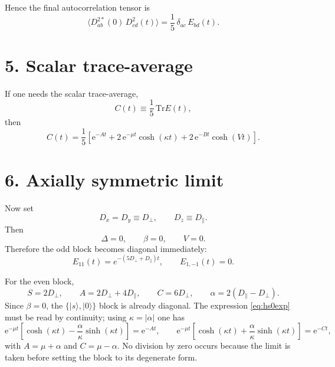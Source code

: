 \documentclass[11pt]{article}
\newcommand{\e}{\mathrm{e}}
\newcommand{\tr}{\mathrm{Tr}}
\begin{document}
Hence the final autocorrelation tensor is
\begin{equation}
\boxed{
\big\langle D^{2*}_{ab}(0)\,D^2_{cd}(t)\big\rangle
=
\frac{1}{5}\,\delta_{ac}\,E_{bd}(t).
}
\end{equation}

\section*{5. Scalar trace-average}

If one needs the scalar trace-average,
\begin{equation}
C(t)\equiv \frac{1}{5}\,\tr E(t),
\end{equation}
then
\begin{equation}
\boxed{
C(t)=\frac15\left[
\e^{-At}
+2\,\e^{-\mu t}\cosh(\kappa t)
+2\,\e^{-Bt}\cosh(Vt)
\right].
}
\end{equation}

\section*{6. Axially symmetric limit}

Now set
\begin{equation}
D_x=D_y\equiv D_\perp,
\qquad
D_z\equiv D_\parallel.
\end{equation}
Then
\begin{equation}
\Delta=0,\qquad \beta=0,\qquad V=0.
\end{equation}
Therefore the odd block becomes diagonal immediately:
\begin{equation}
E_{11}(t)=e^{-(5D_\perp+D_\parallel)t},
\qquad
E_{1,-1}(t)=0.
\end{equation}

For the even block,
\begin{equation}
S=2D_\perp,
\qquad
A=2D_\perp+4D_\parallel,
\qquad
C=6D_\perp,
\qquad
\alpha=2(D_\parallel-D_\perp).
\end{equation}
Since $\beta=0$, the $\{|s\rangle,|0\rangle\}$ block is already diagonal.  The expression \eqref{eq:hs0exp} must be read by continuity; using $\kappa=|\alpha|$ one has
\begin{equation}
\e^{-\mu t}\left[\cosh(\kappa t)- \frac{\alpha}{\kappa}\sinh(\kappa t)\right]=\e^{-At},
\qquad
\e^{-\mu t}\left[\cosh(\kappa t)+ \frac{\alpha}{\kappa}\sinh(\kappa t)\right]=\e^{-Ct},
\end{equation}
with $A=\mu+\alpha$ and $C=\mu-\alpha$.  No division by zero occurs because the limit is taken before setting the block to its degenerate form.
\end{document}
